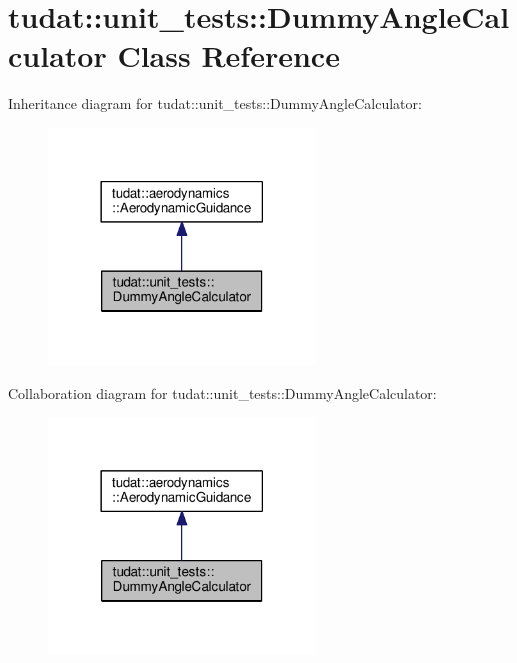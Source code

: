 \hypertarget{classtudat_1_1unit__tests_1_1DummyAngleCalculator}{}\section{tudat\+:\+:unit\+\_\+tests\+:\+:Dummy\+Angle\+Calculator Class Reference}
\label{classtudat_1_1unit__tests_1_1DummyAngleCalculator}


Inheritance diagram for tudat\+:\+:unit\+\_\+tests\+:\+:Dummy\+Angle\+Calculator\+:
\nopagebreak
\begin{figure}[H]
\begin{center}
\leavevmode
\includegraphics[width=201pt]{classtudat_1_1unit__tests_1_1DummyAngleCalculator__inherit__graph}
\end{center}
\end{figure}


Collaboration diagram for tudat\+:\+:unit\+\_\+tests\+:\+:Dummy\+Angle\+Calculator\+:
\nopagebreak
\begin{figure}[H]
\begin{center}
\leavevmode
\includegraphics[width=201pt]{classtudat_1_1unit__tests_1_1DummyAngleCalculator__coll__graph}
\end{center}
\end{figure}
